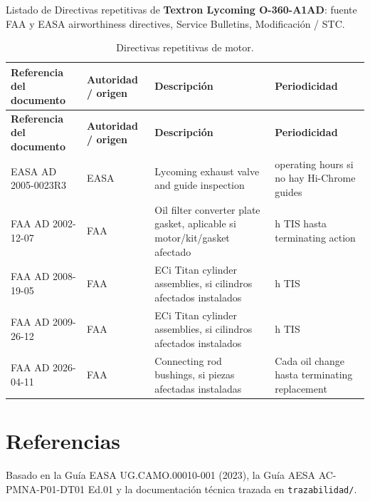 \documentclass[12pt]{article}
\begin{document}
Listado de Directivas repetitivas de \textbf{Textron Lycoming O-360-A1AD}: fuente FAA y EASA airworthiness directives, Service Bulletins, Modificación / STC.

\begingroup
\scriptsize
\setlength{\tabcolsep}{3pt}
\renewcommand{\arraystretch}{1.18}
\begin{longtable}{|>{\raggedright\arraybackslash}p{}|>{\raggedright\arraybackslash}p{}|>{\raggedright\arraybackslash}p{}|>{\raggedright\arraybackslash}p{}|}
\caption{Directivas repetitivas de motor.}
\label{tab:ad-motor}\\
\hline
\textbf{Referencia del documento} & \textbf{Autoridad / origen} & \textbf{Descripción} & \textbf{Periodicidad} \\
\hline
\endfirsthead
\hline
\textbf{Referencia del documento} & \textbf{Autoridad / origen} & \textbf{Descripción} & \textbf{Periodicidad} \\
\hline
\endhead
EASA AD 2005-0023R3 & EASA & Lycoming exhaust valve and guide inspection & 440 operating hours si no hay Hi-Chrome guides \\
\hline
FAA AD 2002-12-07 & FAA & Oil filter converter plate gasket, aplicable si motor/kit/gasket afectado & 50 h TIS hasta terminating action \\
\hline
FAA AD 2008-19-05 & FAA & ECi Titan cylinder assemblies, si cilindros afectados instalados & 50 h TIS \\
\hline
FAA AD 2009-26-12 & FAA & ECi Titan cylinder assemblies, si cilindros afectados instalados & 50 h TIS \\
\hline
FAA AD 2026-04-11 & FAA & Connecting rod bushings, si piezas afectadas instaladas & Cada oil change hasta terminating replacement \\
\hline
\end{longtable}
\endgroup

\section*{Referencias}
\label{sec:referencias}

Basado en la Guía EASA UG.CAMO.00010-001 (2023), la Guía AESA AC-PMNA-P01-DT01 Ed.01 y la documentación técnica trazada en \texttt{trazabilidad/}.
\end{document}
